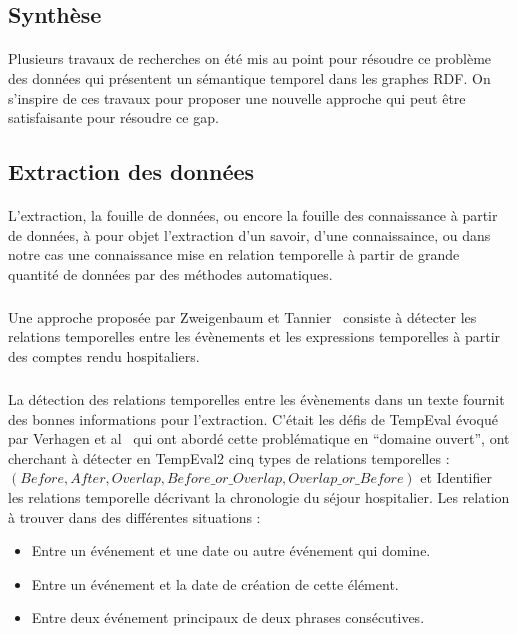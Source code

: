 \subsection*{Synthèse}
\paragraph{}
Plusieurs travaux de recherches on été mis au point pour résoudre ce problème des données qui présentent un sémantique temporel dans les graphes RDF. On s'inspire de ces travaux pour proposer une nouvelle approche qui peut être satisfaisante pour résoudre ce gap.
\subsection*{Extraction des données}
\paragraph{}
L'extraction, la fouille de données, ou encore la fouille des connaissance à partir de données, à pour  objet l'extraction d'un savoir, d'une connaissaince, ou dans notre cas une connaissance mise en relation temporelle à partir de grande quantité de données par des méthodes automatiques.
\subparagraph{}
Une approche proposée par Zweigenbaum et Tannier~\cite{zweigenbaum2013} consiste à détecter les relations temporelles entre les évènements et les expressions temporelles à partir des comptes rendu hospitaliers.
\subparagraph{}
La détection des relations temporelles entre les évènements dans un texte fournit des bonnes informations pour l’extraction.
\newline
C’était les défis de TempEval évoqué par Verhagen et al~\cite{verhagen2010} qui ont abordé cette problématique en “domaine ouvert”, ont cherchant à détecter en TempEval2 cinq types de relations temporelles :
\newline
$(Before, After, Overlap, Before\_or\_Overlap, Overlap\_or\_Before)$
et Identifier les relations temporelle décrivant la chronologie du séjour hospitalier.
\newline
Les relation à trouver dans des différentes situations :
\begin{itemize}
\item{}Entre un événement et une date ou autre événement qui domine.
\item{}Entre un événement et la date de création de cette élément.
\item{}Entre deux événement principaux de deux phrases consécutives.
\end{itemize}
